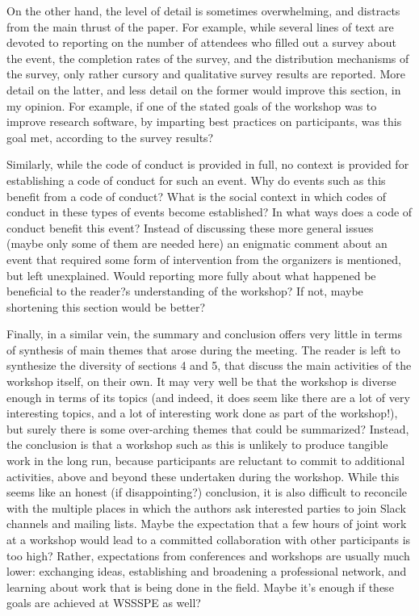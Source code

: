 \documentclass[11pt]{article}
\begin{document}
\begin{quoting}


On the other hand, the level of detail is sometimes overwhelming, and distracts from the main thrust of the paper. For example, while several lines of text are devoted to reporting on the number of attendees who filled out a survey about the event, the completion rates of the survey, and the distribution mechanisms of the survey, only rather cursory and qualitative survey results are reported. More detail on the latter, and less detail on the former would improve this section, in my opinion.  For example, if one of the stated goals of the workshop was to improve research software, by imparting best practices on participants, was this goal met, according to the survey results? 

Similarly, while the code of conduct is provided in full, no context is provided for establishing a code of conduct for such an event. Why do events such as this benefit from a code of conduct? What is the social context in which codes of conduct in these types of events become established? In what ways does a code of conduct benefit this event? Instead of discussing these more general issues (maybe only some of them are needed here) an enigmatic comment about an event that required some form of intervention from the organizers is mentioned, but left unexplained. Would reporting more fully about what happened be beneficial to the reader?s understanding of the workshop? If not, maybe shortening this section would be better?

Finally, in a similar vein, the summary and conclusion offers very little in terms of synthesis of main themes that arose during the meeting. The reader is left to synthesize the diversity of sections 4 and 5, that discuss the main activities of the workshop itself, on their own. It may very well be that the workshop is diverse enough in terms of its topics (and indeed, it does seem like there are a lot of very interesting topics, and a lot of interesting work done as part of the workshop!), but surely there is some over-arching themes that could be summarized? Instead, the conclusion is that a workshop such as this is unlikely to produce tangible work in the long run, because participants are reluctant to commit to additional activities, above and beyond these undertaken during the workshop. While this seems like an honest (if disappointing?) conclusion, it is also difficult to reconcile with the multiple places in which the authors ask interested parties to join Slack channels and mailing lists. Maybe the expectation that a few hours of joint work at a workshop would lead to a committed collaboration with other participants is too high? Rather, expectations from conferences and workshops are usually much lower: exchanging ideas, establishing and broadening a professional network, and learning about work that is being done in the field. Maybe it's enough if these goals are achieved at WSSSPE as well?


\end{quoting}
\end{document}

